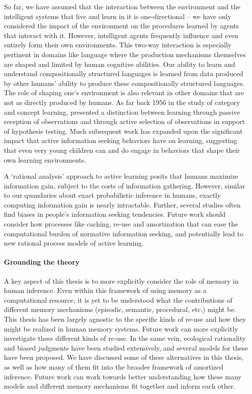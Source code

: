 So far, we have assumed that the interaction between the environment and the intelligent systems that live and learn in it is one-directional -- we have only considered the impact of the environment on the procedures learned by agents that interact with it. However, intelligent agents frequently influence and even entirely form their own environments. This two-way interaction is especially pertinent in domains like language where the production mechanisms themselves are shaped and limited by human cognitive abilities. Our ability to learn and understand compositionally structured languages is learned from data produced by other humans' ability to produce these compositionally structured languages. The role of shaping one's environment is also relevant in other domains that are not as directly produced by humans. As far back 1956 in the study of category and concept learning, \citet{bruner2017study} presented a distinction between learning through passive reception of observations and through active selection of observations in support of hypothesis testing. Much subsequent work has expanded upon the significant impact that active information seeking behaviors have on learning\citep{nelson2005finding,markant2014better, gureckis2012self}, suggesting that even very young children can and do engage in behaviors that shape their own learning environments\citep{ruggeri2017toma, gopnik1996scientist, montessori1912montessori}. 

A `rational analysis' approach to active learning posits that humans maximize information gain, subject to the costs of information gathering. However, similar to our quandaries about exact probabilistic inference in humans, exactly computing information gain is nearly intractable. Further, several studies often find biases in people's information seeking tendencies\citep{jonas2001confirmation, beattie1988confirmation}. Future work should consider how processes like caching, re-use and amortization that can ease the computational burden of normative information seeking, and potentially lead to new rational process models of active learning.

\paragraph{Grounding the theory}

A key aspect of this thesis is to more explicitly consider the role of memory in human inference. Even within this framework of using memory as a computational resource, it is yet to be understood what the contributions of different memory mechanisms (episodic, semantic, procedural, etc.) might be. This thesis has been largely agnostic to the specific kinds of re-use and how they might be realized in human memory systems. Future work can more explicitly investigate these different kinds of re-use. In the same vein, ecological rationality and biased judgments have been studied extensively, and several models for these have been proposed. We have discussed some of these alternatives in this thesis, as well as how many of them fit into the broader framework of amortized inference. Future work can work towards better understanding how these many models and different memory mechanisms fit together and inform each other.

